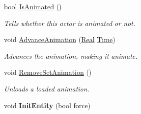\begin{DoxyCompactItemize}
bool \hyperlink{classphys_1_1ActorBase_ac98f9fdae0da939e352f8fcff217457c}{IsAnimated} ()
\begin{DoxyCompactList}\small\item\em Tells whether this actor is animated or not. \item\end{DoxyCompactList}\item 
void \hyperlink{classphys_1_1ActorBase_a37d5a8a3ae4ca3c6e7d14706096faa85}{AdvanceAnimation} (\hyperlink{namespacephys_af7eb897198d265b8e868f45240230d5f}{Real} \hyperlink{structphys_1_1Time}{Time})
\begin{DoxyCompactList}\small\item\em Advances the animation, making it animate. \item\end{DoxyCompactList}\item 
void \hyperlink{classphys_1_1ActorBase_ac42e5e47504d7f296bb0a2bedc2ded07}{RemoveSetAnimation} ()
\begin{DoxyCompactList}\small\item\em Unloads a loaded animation. \item\end{DoxyCompactList}\item 
\hypertarget{classphys_1_1ActorBase_ac79a6383ea52a99d51e8b4445a0bc2da}{
void {\bfseries InitEntity} (bool force)}
\label{d8/d0f/classphys_1_1ActorBase_ac79a6383ea52a99d51e8b4445a0bc2da}


\end{DoxyCompactItemize}
